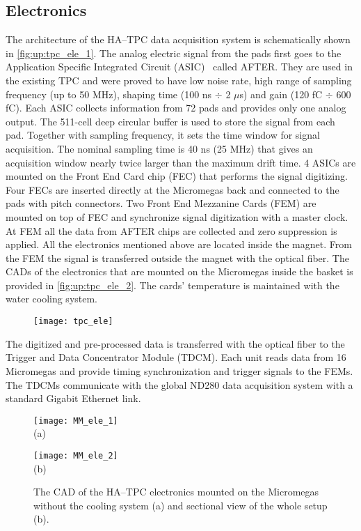 \documentclass[../main.tex]{subfiles}
\begin{document}
\subsection{Electronics}
\label{sec:up:tpc_ele}
The architecture of the HA--TPC data acquisition system is schematically shown in \autoref{fig:up:tpc_ele_1}. The analog electric signal from the pads first goes to the Application Specific Integrated Circuit (ASIC)~\cite{Baron2007} called AFTER. They are used in the existing TPC and were proved to have low noise rate, high range of sampling frequency (up to 50 MHz), shaping time (100 ns $\div$ 2 $\mu$s) and gain (120 fC $\div$ 600 fC). Each ASIC collects information from 72 pads and provides only one analog output. The 511-cell deep circular buffer is used to store the signal from each pad. Together with sampling frequency, it sets the time window for signal acquisition. The nominal sampling time is 40 ns (25 MHz) that gives an acquisition window nearly twice larger than the maximum drift time. 4 ASICs are mounted on the Front End Card chip (FEC) that performs the signal digitizing. Four FECs are inserted directly at the Micromegas back and connected to the pads with pitch connectors. Two Front End Mezzanine Cards (FEM) are mounted on top of FEC and synchronize signal digitization with a master clock. At FEM all the data from AFTER chips are collected and zero suppression is applied. All the electronics mentioned above are located inside the magnet. From the FEM the signal is transferred outside the magnet with the optical fiber. The CADs of the electronics that are mounted on the Micromegas inside the basket is provided in \autoref{fig:up:tpc_ele_2}. The cards' temperature is maintained with the water cooling system.


\begin{figure}[!ht]
  \centering
  \texttt{[image: tpc\_ele]}
  \caption{}
  \label{fig:up:tpc_ele_1}
\end{figure}

The digitized and pre-processed data is transferred with the optical fiber to the Trigger and Data Concentrator Module (TDCM). Each unit reads data from 16 Micromegas and provide timing synchronization and trigger signals to the FEMs. The TDCMs communicate with the global ND280 data acquisition system with a standard Gigabit Ethernet link.

\begin{figure}[!ht]
  \centering
  \begin{minipage}{0.49\linewidth}
    \centering
    \texttt{[image: MM\_ele\_1]} \\ (a)
  \end{minipage}
  \begin{minipage}{0.49\linewidth}
    \centering
    \texttt{[image: MM\_ele\_2]} \\ (b)
  \end{minipage}
  \caption{The CAD of the HA--TPC electronics mounted on the Micromegas without the cooling system (a) and sectional view of the whole setup (b).}
  \label{fig:up:tpc_ele_2}
\end{figure}
\end{document}
